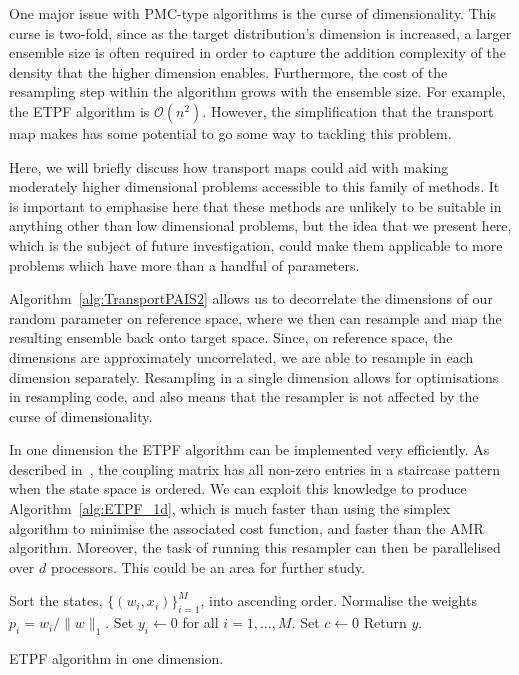 \documentclass[final]{siamltex}
\begin{document}
One major issue with PMC-type algorithms is the curse of
dimensionality. This curse is two-fold, since as the target
distribution's dimension is increased, a larger ensemble size is often
required in order to capture the addition complexity of the density
that the higher dimension enables. Furthermore, the cost of the
resampling step within the algorithm grows with the ensemble size. For
example, the ETPF algorithm is $\mathcal{O}(n^2)$. However, the
simplification that the transport map makes has some potential to go
some way to tackling this problem.

Here, we will briefly discuss how transport maps could aid
with making moderately higher dimensional problems accessible to this
family of methods. It is important to emphasise here that these
methods are unlikely to be suitable in anything other than low
dimensional problems, but the idea that we present here, which is the
subject of future investigation, could make them applicable to more
problems which have more than a handful of parameters.

Algorithm~\ref{alg:TransportPAIS2} allows us to decorrelate the
dimensions of our random parameter on reference space, where we then
can resample and map the resulting ensemble back onto target
space. Since, on reference space, the dimensions are approximately uncorrelated, we
are able to resample in each dimension separately. Resampling in a
single dimension allows for optimisations in resampling code, and also
means that the resampler is not affected by the curse of
dimensionality. 

In one
dimension the ETPF algorithm can be implemented very efficiently. As
described in~\cite{reich2013nonparametric}, the coupling matrix has
all non-zero entries in a staircase pattern when the state space is
ordered. We can exploit this knowledge to produce
Algorithm~\ref{alg:ETPF_1d}, which is much faster than using the
simplex algorithm to minimise the associated cost function, and faster
than the AMR algorithm\cite{cotter2015parallel}. Moreover, the task of
running this resampler can then be parallelised over $d$
processors. This could be an area for further study.

\begin{table}[!htpb]
\begin{algorithm}[H]
\DontPrintSemicolon
\BlankLine
Sort the states, $\{(w_i, x_i)\}_{i=1}^M$, into ascending order.\;
Normalise the weights $p_i = w_i/\|w\|_1$.\;
Set $y_i \leftarrow 0$ for all $i=1,\dots,M$.\;
Set $c \leftarrow 0$\;
Return $y$.\;
\caption{ETPF algorithm in one dimension.\label{alg:ETPF_1d}}
\end{algorithm}
\end{table}
\end{document}

